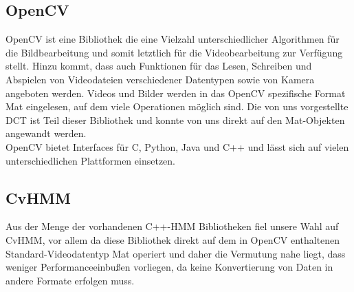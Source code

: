 \subsection{OpenCV}
\label{sec:opencv}
OpenCV ist eine Bibliothek die eine Vielzahl unterschiedlicher Algorithmen für die Bildbearbeitung und somit letztlich für die Videobearbeitung zur Verfügung stellt.
 Hinzu kommt, dass auch Funktionen für das Lesen, Schreiben und Abspielen von Videodateien verschiedener Datentypen sowie von Kamera angeboten werden. Videos und Bilder werden in das OpenCV spezifische Format Mat eingelesen, auf dem viele Operationen möglich sind.  Die von uns vorgestellte DCT ist Teil dieser Bibliothek und konnte von uns direkt auf den Mat-Objekten angewandt werden.\\
OpenCV bietet Interfaces für C, Python, Java und C++ und lässt sich auf vielen unterschiedlichen Plattformen einsetzen.


\subsection{CvHMM}
\label{sec:cvhmm}
Aus der Menge der vorhandenen C++-HMM Bibliotheken fiel unsere Wahl auf CvHMM\cite{cvhmmLINK}, vor allem da diese Bibliothek direkt auf dem in OpenCV enthaltenen Standard-Videodatentyp Mat operiert und daher die Vermutung nahe liegt, dass weniger Performanceeinbußen vorliegen, da keine Konvertierung von Daten in andere Formate erfolgen muss.\\


